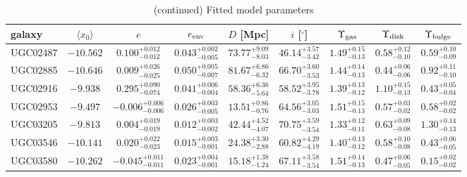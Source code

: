 \documentclass[twocolumn,tighten]{aastex63}
\begin{document}
\newpage

\setcounter{table}{1}
\begin{table}
\caption{(continued) Fitted model parameters}
\begin{center}
  \begin{tabular}{lcccccccc} \hline
 galaxy  & $\langle x_0\rangle$   & $e$  & $e_{\rm env}$ & $D$ [Mpc]  & $i$ [$^\circ$] & $\Upsilon_{\rm gas}$ & $\Upsilon_{\rm disk}$  & $\Upsilon_{\rm bulge}$  \\
 \hline
   UGC02487 & $ -10.562  $ & $ 0.100 _{ -0.012 } ^{ + 0.012 } $ & $ 0.043 _{ -0.005 } ^{ + 0.002 } $ & $ 73.77 _{ -8.03 } ^{ + 9.09 } $ & $ 46.14 _{ -3.42 } ^{ + 3.57 } $ & $ 1.49 _{ -0.13 } ^{ + 0.15 } $ & $ 0.58 _{ -0.10 } ^{ + 0.12 } $ & $ 0.59 _{ -0.09 } ^{ + 0.10 } $  \\  
   UGC02885 & $ -10.646  $ & $ 0.009 _{ -0.025 } ^{ + 0.026 } $ & $ 0.050 _{ -0.007 } ^{ + 0.005 } $ & $ 81.67 _{ -6.32 } ^{ + 6.86 } $ & $ 66.70 _{ -3.53 } ^{ + 3.60 } $ & $ 1.44 _{ -0.13 } ^{ + 0.14 } $ & $ 0.44 _{ -0.06 } ^{ + 0.06 } $ & $ 0.92 _{ -0.10 } ^{ + 0.11 } $  \\  
   UGC02916 & $ -9.938  $ & $ 0.295 _{ -0.074 } ^{ + 0.090 } $ & $ 0.041 _{ -0.004 } ^{ + 0.006 } $ & $ 58.36 _{ -5.64 } ^{ + 6.36 } $ & $ 58.52 _{ -3.78 } ^{ + 3.95 } $ & $ 1.39 _{ -0.12 } ^{ + 0.13 } $ & $ 1.10 _{ -0.13 } ^{ + 0.15 } $ & $ 0.43 _{ -0.04 } ^{ + 0.05 } $  \\  
   UGC02953 & $ -9.497  $ & $ -0.006 _{ -0.006 } ^{ + 0.006 } $ & $ 0.026 _{ -0.005 } ^{ + 0.003 } $ & $ 13.51 _{ -0.76 } ^{ + 0.86 } $ & $ 64.56 _{ -3.03 } ^{ + 3.05 } $ & $ 1.51 _{ -0.13 } ^{ + 0.15 } $ & $ 0.57 _{ -0.02 } ^{ + 0.03 } $ & $ 0.58 _{ -0.02 } ^{ + 0.02 } $  \\  
   UGC03205 & $ -9.813  $ & $ 0.004 _{ -0.019 } ^{ + 0.019 } $ & $ 0.012 _{ -0.002 } ^{ + 0.003 } $ & $ 42.44 _{ -4.07 } ^{ + 4.52 } $ & $ 70.75 _{ -3.54 } ^{ + 3.59 } $ & $ 1.33 _{ -0.11 } ^{ + 0.12 } $ & $ 0.63 _{ -0.08 } ^{ + 0.09 } $ & $ 1.30 _{ -0.13 } ^{ + 0.14 } $  \\  
   UGC03546 & $ -10.141  $ & $ 0.020 _{ -0.023 } ^{ + 0.022 } $ & $ 0.015 _{ -0.001 } ^{ + 0.003 } $ & $ 24.38 _{ -2.88 } ^{ + 3.30 } $ & $ 60.82 _{ -4.19 } ^{ + 4.29 } $ & $ 1.40 _{ -0.12 } ^{ + 0.13 } $ & $ 0.58 _{ -0.08 } ^{ + 0.10 } $ & $ 0.43 _{ -0.05 } ^{ + 0.06 } $  \\  
   UGC03580 & $ -10.262  $ & $ -0.045 _{ -0.011 } ^{ + 0.011 } $ & $ 0.023 _{ -0.001 } ^{ + 0.004 } $ & $ 15.18 _{ -1.24 } ^{ + 1.38 } $ & $ 67.11 _{ -3.54 } ^{ + 3.58 } $ & $ 1.51 _{ -0.13 } ^{ + 0.14 } $ & $ 0.47 _{ -0.05 } ^{ + 0.06 } $ & $ 0.15 _{ -0.02 } ^{ + 0.02 } $  \\  

\end{tabular}
\end{center}
\end{table}
\end{document}
